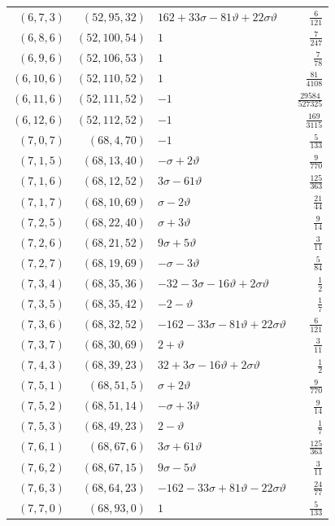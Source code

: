 \begin{longtable}{rrlr}
$(6,7,3)$ & $(52,95,32)$ & $162+33\sigma-81\vartheta+22\sigma\vartheta$ & $\frac{6}{121}$\\
$(6,8,6)$ & $(52,100,54)$ & $1$ & $\frac{7}{247}$\\
$(6,9,6)$ & $(52,106,53)$ & $1$ & $\frac{7}{78}$\\
$(6,10,6)$ & $(52,110,52)$ & $1$ & $\frac{81}{4108}$\\
$(6,11,6)$ & $(52,111,52)$ & $-1$ & $\frac{29584}{527325}$\\
$(6,12,6)$ & $(52,112,52)$ & $-1$ & $\frac{169}{3115}$\\
$(7,0,7)$ & $(68,4,70)$ & $-1$ & $\frac{5}{133}$\\
$(7,1,5)$ & $(68,13,40)$ & $-\sigma+2\vartheta$ & $\frac{9}{770}$\\
$(7,1,6)$ & $(68,12,52)$ & $3\sigma-61\vartheta$ & $\frac{125}{363}$\\
$(7,1,7)$ & $(68,10,69)$ & $\sigma-2\vartheta$ & $\frac{21}{44}$\\
$(7,2,5)$ & $(68,22,40)$ & $\sigma+3\vartheta$ & $\frac{9}{14}$\\
$(7,2,6)$ & $(68,21,52)$ & $9\sigma+5\vartheta$ & $\frac{3}{11}$\\
$(7,2,7)$ & $(68,19,69)$ & $-\sigma-3\vartheta$ & $\frac{5}{84}$\\
$(7,3,4)$ & $(68,35,36)$ & $-32-3\sigma-16\vartheta+2\sigma\vartheta$ & $\frac{1}{2}$\\
$(7,3,5)$ & $(68,35,42)$ & $-2-\vartheta$ & $\frac{1}{7}$\\
$(7,3,6)$ & $(68,32,52)$ & $-162-33\sigma-81\vartheta+22\sigma\vartheta$ & $\frac{6}{121}$\\
$(7,3,7)$ & $(68,30,69)$ & $2+\vartheta$ & $\frac{3}{11}$\\
$(7,4,3)$ & $(68,39,23)$ & $32+3\sigma-16\vartheta+2\sigma\vartheta$ & $\frac{1}{2}$\\
$(7,5,1)$ & $(68,51,5)$ & $\sigma+2\vartheta$ & $\frac{9}{770}$\\
$(7,5,2)$ & $(68,51,14)$ & $-\sigma+3\vartheta$ & $\frac{9}{14}$\\
$(7,5,3)$ & $(68,49,23)$ & $2-\vartheta$ & $\frac{1}{7}$\\
$(7,6,1)$ & $(68,67,6)$ & $3\sigma+61\vartheta$ & $\frac{125}{363}$\\
$(7,6,2)$ & $(68,67,15)$ & $9\sigma-5\vartheta$ & $\frac{3}{11}$\\
$(7,6,3)$ & $(68,64,23)$ & $-162-33\sigma+81\vartheta-22\sigma\vartheta$ & $\frac{24}{77}$\\
$(7,7,0)$ & $(68,93,0)$ & $1$ & $\frac{5}{133}$\\

\end{longtable}
